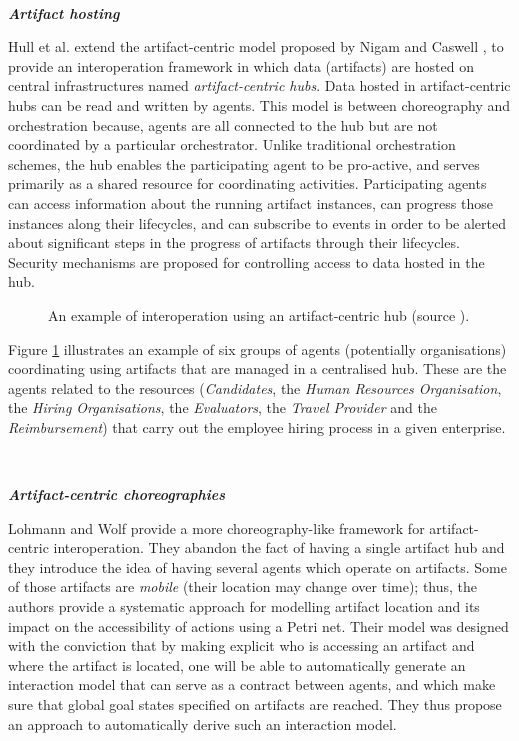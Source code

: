 ~

\noindent\textbf{\textit{Artifact hosting \cite{hull2009facilitating}}}

Hull et al. extend the artifact-centric model proposed by Nigam and Caswell \citeyearpar{nigam2003business}, to provide an interoperation framework in which data (artifacts) are hosted on central infrastructures named \textit{artifact-centric hubs}. Data hosted in artifact-centric hubs can be read and written by agents. This model is between choreography and orchestration because, agents are all connected to the hub but are not coordinated by a particular orchestrator. Unlike traditional orchestration schemes, the hub enables the participating agent to be pro-active, and serves primarily as a shared resource for coordinating activities. Participating agents can access information about the running artifact instances, can progress those instances along their lifecycles, and can subscribe to events in order to be alerted about significant steps in the progress of artifacts through their lifecycles. Security mechanisms are proposed for controlling access to data hosted in the hub.
\begin{figure}[ht!]
	\noindent
	\caption{An example of interoperation using an artifact-centric hub (source \cite{hull2009facilitating}).}
	\label{chap1:fig:artifact-hub}
\end{figure}

Figure \ref{chap1:fig:artifact-hub} illustrates an example of six groups of agents (potentially organisations) coordinating using artifacts that are managed in a centralised hub. These are the agents related to the resources (\textit{Candidates}, the \textit{Human Resources Organisation}, the \textit{Hiring Organisations}, the \textit{Evaluators}, the \textit{Travel Provider} and the \textit{Reimbursement}) that carry out the employee hiring process in a given enterprise.


~

\noindent\textbf{\textit{Artifact-centric choreographies \cite{lohmann2010artifact}}}

Lohmann and Wolf \citeyearpar{lohmann2010artifact} provide a more choreography-like framework for artifact-centric interoperation. They abandon the fact of having a single artifact hub \cite{hull2009facilitating} and they introduce the idea of having several agents which operate on artifacts. Some of those artifacts are \textit{mobile} (their location may change over time); thus, the authors provide a systematic approach for modelling artifact location and its impact on the accessibility of actions using a Petri net. Their model was designed with the conviction that by making explicit who is accessing an artifact and where the artifact is located, one will be able to automatically generate an interaction model that can serve as a contract between agents, and which make sure that global goal states specified on artifacts are reached. They thus propose an approach to automatically derive such an interaction model.



